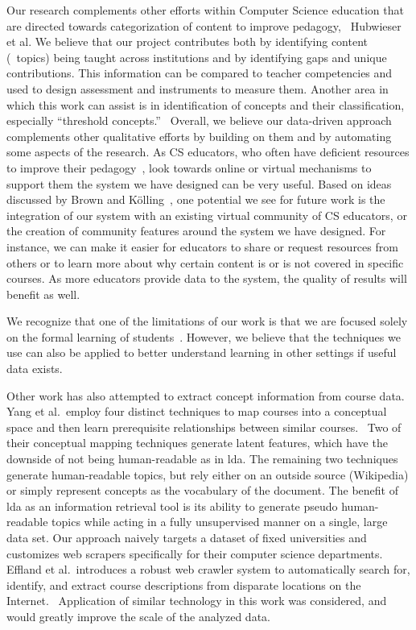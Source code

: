 Our research complements other efforts within Computer Science education that are directed towards categorization of content to improve pedagogy, \eg\ Hubwieser et al.\cite{hubwieser2013}
We believe that our project contributes both by identifying content (\ie\ topics) being taught across institutions and by identifying gaps and unique contributions.
This information can be compared to teacher competencies and used to design assessment and instruments to measure them.
Another area in which this work can assist is in identification of concepts and their classification, especially ``threshold concepts.''~\cite{ShinnersKennedyFincher2013}
Overall, we believe our data-driven approach complements other qualitative efforts by building on them and by automating some aspects of the research.
As CS educators, who often have deficient resources to improve their pedagogy~\cite{Brown2013}, look towards online or virtual mechanisms to support them the system we have designed can be very useful.
Based on ideas discussed by Brown and K\"{o}lling~\cite{Brown2013}, one potential we see for future work is the integration of our system with an existing virtual community of CS educators, or the creation of community features around the system we have designed.
For instance, we can make it easier for educators to share or request resources from others or to learn more about why certain content is or is not covered in specific courses.
As more educators provide data to the system, the quality of results will benefit as well.


We recognize that one of the limitations of our work is that we are focused solely on the formal learning of students~\cite{Boustedt2011}.
However, we believe that the techniques we use can also be applied to better understand learning in other settings if useful data exists.


Other work has also attempted to extract concept information from course data.
Yang et al.\ employ four distinct techniques to map courses into a conceptual space and then learn prerequisite relationships between similar courses.~\cite{Yang2015}
Two of their conceptual mapping techniques generate latent features, which have the downside of not being human-readable as in \ac{lda}.
The remaining two techniques generate human-readable topics, but rely either on an outside source (Wikipedia) or simply represent concepts as the vocabulary of the document.
The benefit of \ac{lda} as an information retrieval tool is its ability to generate pseudo human-readable topics while acting in a fully unsupervised manner on a single, large data set.
Our approach naively targets a dataset of fixed universities and customizes web scrapers specifically for their computer science departments.
Effland et al.\ introduces a robust web crawler system to automatically search for, identify, and extract course descriptions from disparate locations on the Internet.~\cite{Effland2015}
Application of similar technology in this work was considered, and would greatly improve the scale of the analyzed data.


